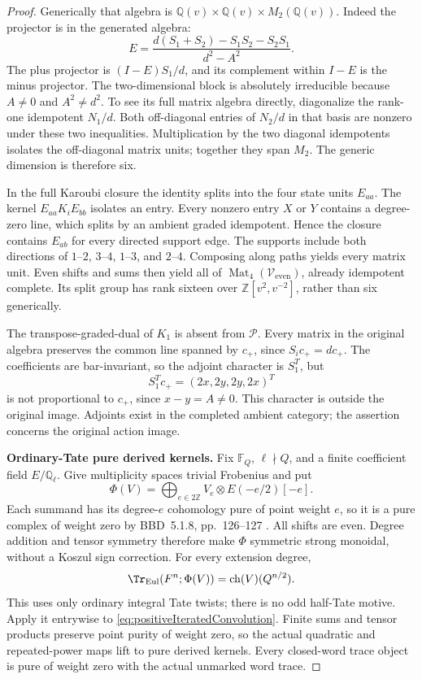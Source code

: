 \documentclass[11pt,a4paper]{article}
\newcommand{\Q}{\mathbb Q}\newcommand{\Z}{\mathbb Z}\newcommand{\C}{\mathbb C}\newcommand{\N}{\mathbb N}\newcommand{\F}{\mathbb F}
\theoremstyle{named}\newtheorem{finding}{Finding}[section]
\theoremstyle{definition}\newtheorem{definition}[finding]{Definition}
\theoremstyle{remark}\newtheorem{remark}[finding]{Remark}
\begin{document}
\begin{proof}
Generically that algebra is
\(\Q(v)\times\Q(v)\times M_2(\Q(v))\).
Indeed the projector is in the generated algebra:
\[
 E=\frac{d(S_1+S_2)-S_1S_2-S_2S_1}{d^2-A^2}.
\]
The plus projector is \((I-E)S_1/d\), and its
complement within \(I-E\) is the minus projector.
The two-dimensional block is absolutely irreducible
because \(A\ne0\) and \(A^2\ne d^2\).
To see its full matrix algebra directly, diagonalize
the rank-one idempotent \(N_1/d\).
Both off-diagonal entries of \(N_2/d\) in that
basis are nonzero under these two inequalities.
Multiplication by the two diagonal idempotents
isolates the off-diagonal matrix units; together
they span \(M_2\).
The generic dimension is therefore six.

In the full Karoubi closure the identity splits into
the four state units \(E_{aa}\).
The kernel \(E_{aa}K_iE_{bb}\) isolates an entry.
Every nonzero entry \(X\) or \(Y\) contains a
degree-zero line, which splits by an ambient graded
idempotent. Hence the closure contains \(E_{ab}\)
for every directed support edge.
The supports include both directions of
\(1\)--\(2\), \(3\)--\(4\),
\(1\)--\(3\), and \(2\)--\(4\).
Composing along paths yields every matrix unit.
Even shifts and sums then yield all of
\(\operatorname{Mat}_4(\mathcal V_{\mathrm{even}})\),
already idempotent complete.
Its split group has rank sixteen over
\(\Z[v^2,v^{-2}]\), rather than six generically.

The transpose-graded-dual of \(K_1\) is absent
from \(\mathcal P\). Every matrix in the original
algebra preserves the common line spanned by
\(c_+\), since \(S_ic_+=dc_+\).
The coefficients are bar-invariant, so the adjoint
character is \(S_1^T\), but
\[
                       S_1^Tc_+=(2x,2y,2y,2x)^T
\]
is not proportional to \(c_+\), since \(x-y=A\ne0\).
This character is outside the original image.
Adjoints exist in the completed ambient category;
the assertion concerns the original action image.

\par\smallskip\noindent\textbf{Ordinary-Tate pure derived kernels.}\quad
Fix \(\F_Q\), \(\ell\nmid Q\), and a finite
coefficient field \(E/\Q_\ell\).
Give multiplicity spaces trivial Frobenius and put
\begin{equation}\label{eq:positiveIteratedTateFunctor}
                \Phi(V)=\bigoplus_{e\in2\Z}
                    V_e\otimes E(-e/2)[-e].
\end{equation}
Each summand has its degree-\(e\) cohomology pure
of point weight \(e\), so it is a pure complex of
weight zero by BBD~5.1.8, pp.~126--127
\cite{BBD}.
All shifts are even. Degree addition and tensor
symmetry therefore make \(\Phi\) symmetric strong
monoidal, without a Koszul sign correction.
For every extension degree,
\[
       \Tr_{\mathrm{Eul}}(F^n;\Phi(V))
                       =\operatorname{ch}(V)(Q^{n/2}).
\]
This uses only ordinary integral Tate twists;
there is no odd half-Tate motive.
Apply it entrywise to
\eqref{eq:positiveIteratedConvolution}.
Finite sums and tensor products preserve point
purity of weight zero, so the actual quadratic
and repeated-power maps lift to pure derived
kernels. Every closed-word trace object is pure
of weight zero with the actual unmarked word trace.


\end{proof}
\end{document}
